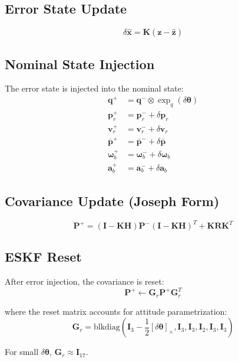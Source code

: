 \documentclass[11pt,a4paper]{article}
\newcommand{\quat}{\mathbf{q}}
\newcommand{\pr}{\mathbf{p}_r}
\newcommand{\vr}{\mathbf{v}_r}
\newcommand{\pbar}{\bar{\mathbf{p}}}
\newcommand{\bgyr}{\bm{\omega}_b}
\newcommand{\bacc}{\mathbf{a}_b}
\newcommand{\I}{\mathbf{I}}
\renewcommand{\skew}[1]{\left[#1\right]_\times}
\begin{document}
\subsection{Error State Update}
\begin{equation}
    \delta\hat{\mathbf{x}} = \mathbf{K} \left(\mathbf{z} - \hat{\mathbf{z}}\right)
\end{equation}

\subsection{Nominal State Injection}
The error state is injected into the nominal state:
\begin{align}
    \quat^+ &= \quat^- \otimes \exp_q(\delta\bm{\theta}) \\
    \pr^+ &= \pr^- + \delta\pr \\
    \vr^+ &= \vr^- + \delta\vr \\
    \pbar^+ &= \pbar^- + \delta\pbar \\
    \bgyr^+ &= \bgyr^- + \delta\bgyr \\
    \bacc^+ &= \bacc^- + \delta\bacc
\end{align}

\subsection{Covariance Update (Joseph Form)}
\begin{equation}
    \mathbf{P}^+ = (\I - \mathbf{K}\mathbf{H}) \mathbf{P}^- (\I - \mathbf{K}\mathbf{H})^T + \mathbf{K} \mathbf{R} \mathbf{K}^T
\end{equation}

\subsection{ESKF Reset}
After error injection, the covariance is reset:
\begin{equation}
    \mathbf{P}^+ \leftarrow \mathbf{G}_r \mathbf{P}^+ \mathbf{G}_r^T
\end{equation}

where the reset matrix accounts for attitude parametrization:
\begin{equation}
    \mathbf{G}_r = \text{blkdiag}\left(\I_3 - \frac{1}{2}\skew{\delta\bm{\theta}}, \I_3, \I_3, \I_2, \I_3, \I_3\right)
\end{equation}

For small $\delta\bm{\theta}$, $\mathbf{G}_r \approx \I_{17}$.
\end{document}
